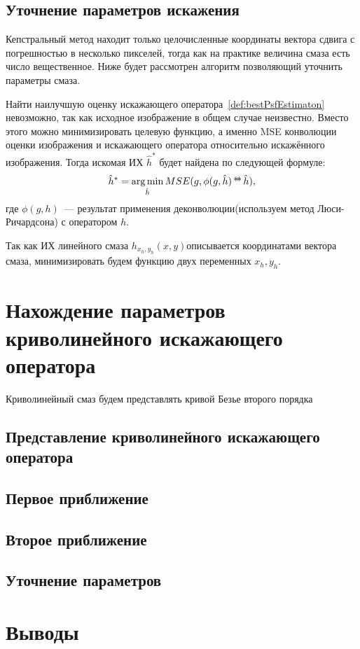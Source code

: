 \subsection{Уточнение параметров искажения}
Кепстральный метод находит только целочисленные координаты вектора сдвига с погрешностью в несколько пикселей, тогда как на практике величина смаза есть число вещественное. Ниже будет рассмотрен алгоритм позволяющий уточнить параметры смаза.

Найти наилучшую оценку искажающего оператора~\ref{def:bestPsfEstimaton} невозможно, так как исходное изображение в общем случае неизвестно. Вместо этого можно минимизировать целевую функцию, а именно MSE конволюции оценки изображения и искажающего оператора относительно искажённого изображения. Тогда искомая ИХ $\hat{h}^*$ будет найдена по следующей формуле:
\begin{equation}\label{eq:bestPsf}
\hat{h}^* = \operatorname*{arg\,min}_{\hat{h}} MSE(g, \phi(g,\hat{h}) \operatorname*{*\!*} \hat{h}),
\end{equation}
где $\phi(g, h)$~--- результат применения деконволюции(используем метод Люси-Ричардсона) с оператором $h$.

Так как ИХ линейного смаза $h_{x_h,y_h}(x,y)$описывается координатами вектора смаза, минимизировать будем функцию двух переменных $x_h, y_h$.

\section{Нахождение параметров криволинейного искажающего оператора}
Криволинейный смаз будем представлять кривой Безье второго порядка
\subsection{Представление криволинейного искажающего оператора}
\subsection{Первое приближение}
\subsection{Второе приближение}
\subsection{Уточнение параметров}
\section{Выводы}
